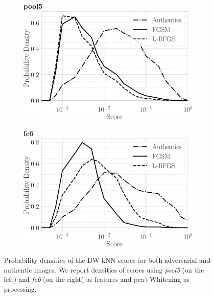 \begin{figure}
\centering%
%
\begin{subfigure}[t]{0.5\linewidth}%
\centering
\textbf{pool5}\\
\includegraphics[width=\linewidth]{distrib-pool5}%
\label{fig:adv:score-density-pool5}%
\end{subfigure}%
%
\begin{subfigure}[t]{0.5\linewidth}%
\centering
\textbf{fc6}\\
\includegraphics[width=\linewidth]{distrib-fc6}%
\label{fig:adv:score-density-fc6}%
\end{subfigure}%
%
\caption{Probability densities of the DW-kNN scores for both adversarial and authentic images.
We report densities of scores using \emph{pool5} (on the left) and \emph{fc6} (on the right) as features and \gls{pca}+Whitening as processing.}
\label{fig:adv:score-densities}
\end{figure}

